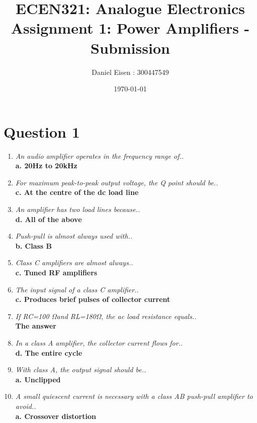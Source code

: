 \documentclass[11pt]{article}
\title{ECEN321: Analogue Electronics \\ Assignment 1: Power Amplifiers - Submission}
\author{Daniel Eisen : 300447549}
\date{\today}
\begin{document}
\maketitle
\section*{Question 1}
  \begin{enumerate}[label = \Roman*.]
          \item \textit{An audio amplifier operates in the frequency range of..} \\ 
          \textbf{a. 20Hz to 20kHz} 

          \item \textit{For maximum peak-to-peak output voltage, the Q point should be..} \\ 
          \textbf{c. At the centre of the dc load line}
          
          \item \textit{An amplifier has two load lines because..} \\ 
          \textbf{d. All of the above} 
          
          \item \textit{Push-pull is almost always used with..} \\ 
          \textbf{b. Class B} 
          
          \item \textit{Class C amplifiers are almost always..} \\ 
          \textbf{c. Tuned RF amplifiers} 
          
          \item \textit{The input signal of a class C amplifier..} \\ 
          \textbf{c. Produces brief pulses of collector current} 
          
          \item \textit{If RC=100 Ωand RL=180Ω, the ac load resistance equals..} \\ 
          \textbf{The answer} 
          
          \item \textit{In a class A amplifier, the collector current flows for..} \\ 
          \textbf{d. The entire cycle} 
          
          \item \textit{With class A, the output signal should be..} \\ 
          \textbf{a. Unclipped} 
          
          \item \textit{A small quiescent current is necessary with a class AB push-pull amplifier to avoid..} \\ 
          \textbf{a. Crossover distortion} 
  \end{enumerate}
\end{document}
